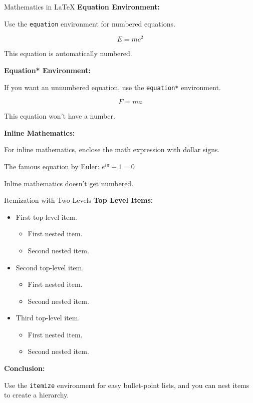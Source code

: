 \documentclass[aspectratio=169]{beamer}
\begin{document}
\begin{frame}{Mathematics in \LaTeX}
  \textbf{Equation Environment:}

  Use the \texttt{equation} environment for numbered equations.

  \begin{equation}
    E = mc^2
  \end{equation}

  This equation is automatically numbered.

  \textbf{Equation* Environment:}

  If you want an unnumbered equation, use the \texttt{equation*} environment.

  \begin{equation*}
    F = ma
  \end{equation*}

  This equation won't have a number.

  \textbf{Inline Mathematics:}

  For inline mathematics, enclose the math expression with dollar signs.

  The famous equation by Euler: $e^{i\pi} + 1 = 0$

  Inline mathematics doesn't get numbered.
\end{frame}

\begin{frame}{Itemization with Two Levels}
  \textbf{Top Level Items:}

  \begin{itemize}
    \item First top-level item.
      \begin{itemize}
        \item First nested item.
        \item Second nested item.
      \end{itemize}
    \item Second top-level item.
      \begin{itemize}
        \item First nested item.
        \item Second nested item.
      \end{itemize}
    \item Third top-level item.
      \begin{itemize}
        \item First nested item.
        \item Second nested item.
      \end{itemize}
  \end{itemize}

  \textbf{Conclusion:}

  Use the \texttt{itemize} environment for easy bullet-point lists, and you can nest items to create a hierarchy.
\end{frame}
\end{document}
